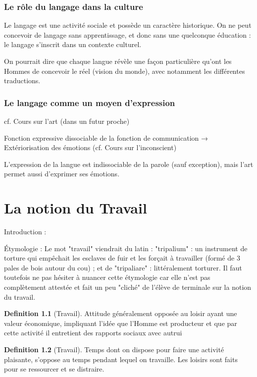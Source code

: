 \documentclass[french]{book}
\theoremstyle{definition}
\newtheorem*{dfn}{Definition}
\begin{document}
\subsection{Le rôle du langage dans la culture}

Le langage est une activité sociale et possède un caractère historique. On ne peut concevoir de langage sans apprentissage, et donc sans une quelconque éducation : le langage s'inscrit dans un contexte culturel.

On pourrait dire que chaque langue révèle une façon particulière qu'ont les Hommes de concevoir le réel (vision du monde), avec notamment les différentes traductions.

\subsection{Le langage comme un moyen d'expression}
cf. Cours sur l'art (dans un futur proche)

Fonction expressive dissociable de la fonction de communication → Extériorisation des émotions (cf. Cours sur l'inconscient)

L'expression de la langue est indissociable de la parole (sauf exception), mais l'art permet aussi d'exprimer ses émotions.


\chapter{La notion du Travail}

Introduction :

Étymologie :
Le mot "travail" viendrait du latin :
"tripalium" : un instrument de torture qui empêchait les esclaves de fuir et les forçait à travailler (formé de 3 pales de bois autour du cou) ;
et de "tripaliare" : littéralement torturer.
Il faut toutefois ne pas hésiter à nuancer cette étymologie car elle n'est pas complètement attestée et fait un peu "cliché" de l'élève de terminale sur la notion du travail.



\begin{dfn}[Travail]
	Attitude généralement opposée au loisir ayant une valeur économique, impliquant l'idée que l'Homme est producteur et que par cette activité il entretient des rapports sociaux avec autrui
\end{dfn}


\begin{dfn}[Travail]
	Temps dont on dispose pour faire une activité plaisante, s'oppose au temps pendant lequel on travaille.
Les loisirs sont faits pour se ressourcer et se distraire.
\end{dfn}
\end{document}
